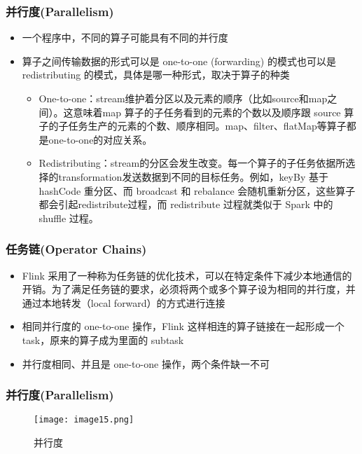 \documentclass{beamer}
\begin{document}
  \begin{frame}
      \frametitle{并行度(Parallelism)}
  
      \begin{itemize}
          \item 一个程序中，不同的算子可能具有不同的并行度
          \item 算子之间传输数据的形式可以是 one-to-one (forwarding) 的模式也可以是redistributing 的模式，具体是哪一种形式，取决于算子的种类
          \begin{itemize}
              \item One-to-one：stream维护着分区以及元素的顺序（比如source和map之间）。这意味着map 算子的子任务看到的元素的个数以及顺序跟 source 算子的子任务生产的元素的个数、顺序相同。map、filter、flatMap等算子都是one-to-one的对应关系。
              \item Redistributing：stream的分区会发生改变。每一个算子的子任务依据所选择的transformation发送数据到不同的目标任务。例如，keyBy 基于 hashCode 重分区、而 broadcast 和 rebalance 会随机重新分区，这些算子都会引起redistribute过程，而 redistribute 过程就类似于 Spark 中的 shuffle 过程。
          \end{itemize}
      \end{itemize}
  
  \end{frame}

  \begin{frame}
      \frametitle{任务链(Operator Chains)}
  
      \begin{itemize}
          \item Flink 采用了一种称为任务链的优化技术，可以在特定条件下减少本地通信的开销。为了满足任务链的要求，必须将两个或多个算子设为相同的并行度，并通过本地转发（local forward）的方式进行连接
          \item 相同并行度的 one-to-one 操作，Flink 这样相连的算子链接在一起形成一个 task，原来的算子成为里面的 subtask
          \item 并行度相同、并且是 one-to-one 操作，两个条件缺一不可
      \end{itemize}
  
  \end{frame}

  \begin{frame}
      \frametitle{并行度(Parallelism)}

      \begin{figure}
        \centering
        \texttt{[image: image15.png]}
        \caption{并行度}
      \end{figure}
      
  \end{frame}
\end{document}
